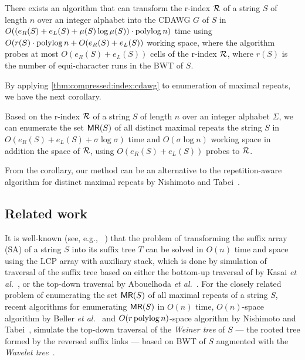 \documentclass{article}
\begin{document}
\begin{theorem}\label{thm:compressed:index:cdawg}
There exists an algorithm that can transform the r-index $\mathcal{R}$ of a string $S$ of length $n$ over an integer alphabet into the CDAWG $G$ of $S$
  in $O((e_R(S) + e_L(S) + \mu(S)\log\mu(S))\cdot \operatorname{\mathrm{polylog}} n)$ time
  using
  $O(r(S)\cdot \operatorname{\mathrm{polylog}} n + O(e_R(S) + e_L(S))$ working space,
  where the algorithm probes at most $O(e_R(S) + e_L(S))$ cells of the r-index $\mathcal{R}$, where $r(S)$ is the number of equi-character runs in the BWT of $S$. 
\end{theorem}

By applying \cref{thm:compressed:index:cdawg} to enumeration of maximal repeats, we have the next corollary. 

\begin{corollary}\label{cor:main:index:maxrep}
  Based on the r-index $\mathcal{R}$ of a string $S$ of length $n$ over an integer alphabet $\Sigma$, we can enumerate the set $\textsf{MR}(S)$ of all distinct maximal repeats the string $S$ in $O(e_R(S)+e_L(S) + \sigma\log\sigma)$ time and $O(\sigma \log n)$ working space in addition the space of $\mathcal{R}$, using $O(e_R(S) + e_L(S))$ probes to $\mathcal{R}$. 
\end{corollary}



From the corollary, our method can be an alternative to the repetition-aware algorithm for distinct maximal repeats by Nishimoto and Tabei~\cite{nishimoto:cpm2021enum}.



\subsection{Related work}
It is well-known (see, e.g., ~\cite{crochemore2021book125problems:chap:satostree}) that the problem of transforming the suffix array (SA) of a string $S$ into its suffix tree $T$ can be solved in $O(n)$ time and space using the LCP array with auxiliary stack, which is done by simulation of traversal of the suffix tree based on either the bottom-up traversal of by Kasai \textit{et al.}~\cite{kasai:lee2001lcp:linear},
or the top-down traversal by Abouelhoda \textit{et al.}~\cite{abouelhoda2004replacing}.
For the closely related problem of enumerating the set $\textsf{MR}(S)$ of all maximal repeats of a string $S$, recent algorithms for enumerating $\textsf{MR}(S)$ in $O(n)$ time, $O(n)$-space algorithm by Beller \textit{et al.}~\cite{beller:berger2012space:efficient:bbo} and $O(r\operatorname{\mathrm{polylog}} n)$-space algorithm by Nishimoto and Tabei~\cite{nishimoto:cpm2021enum}, simulate the top-down traversal of the \textit{Weiner tree} of $S$ --- the rooted tree formed by the reversed suffix links ---  based on BWT of $S$ augmented with the \textit{Wavelet tree}~\cite{grossi2003high}.
\end{document}
